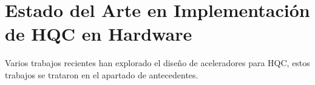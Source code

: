 \section{Estado del Arte en Implementación de HQC en Hardware}
Varios trabajos recientes han explorado el diseño de aceleradores para HQC, estos trabajos se trataron en el apartado de antecedentes.

